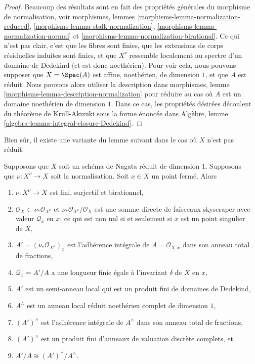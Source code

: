 \begin{proof}
Beaucoup des résultats sont en fait des propriétés
générales du morphisme de normalisation, voir
morphismes, lemmes
\ref{morphisms-lemma-normalization-reduced},
\ref{morphisms-lemma-stalk-normalization},
\ref{morphisms-lemma-normalization-normal} et
\ref{morphisms-lemma-normalization-birational}. Ce qui n'est
pas clair, c'est que les fibres sont finies, que les
extensions de corps résiduelles induites sont finies, et que
$X^\nu$ ressemble localement au spectre d'un domaine de
Dedekind (et est donc noethérien). Pour voir cela, nous pouvons
supposer que $X = \Spec(A)$ est affine, noethérien, de
dimension $1$, et que $A$ est réduit. Nous pouvons alors
utiliser la description dans morphismes, lemme
\ref{morphisms-lemma-description-normalization} pour réduire au cas où
$A$ est un domaine noethérien de dimension $1$. Dans ce cas, les
propriétés désirées découlent du théorème de Krull-Akizuki sous la forme
énoncée dans Algèbre, lemme \ref{algebra-lemma-integral-closure-Dedekind}.
\end{proof}

\noindent
Bien sûr, il existe une variante du lemme
suivant dans le cas où $X$ n'est pas réduit.

\begin{lemma}
\label{lemma-prepare-delta-invariant}
Supposons que $X$ soit un schéma de Nagata réduit de dimension $1$. Supposons que
$\nu : X^\nu \to X$ soit la normalisation. Soit $x \in X$ un point fermé. Alors
\begin{enumerate}
\item $\nu : X^\nu \to X$ est fini, surjectif et
birationnel, \item $\mathcal{O}_X \subset
\nu_*\mathcal{O}_{X^\nu}$ et
$\nu_*\mathcal{O}_{X^\nu}/\mathcal{O}_X$ est une somme
directe de faisceaux skyscraper avec valeur
$\mathcal{Q}_x$ en $x$, ce qui est non nul si et
seulement si $x$ est un point singulier de $X$, \item
$A' = (\nu_*\mathcal{O}_{X^\nu})_x$ est l'adhérence
intégrale de $A = \mathcal{O}_{X, x}$ dans son anneau
total de fractions, \item $\mathcal{Q}_x = A'/A$ a une
longueur finie égale à l'invariant $\delta$ de $X$ en
$x$, \item $A'$ est un semi-anneau local qui est un
produit fini de domaines de Dedekind, \item $A^\wedge$
est un anneau local réduit noethérien complet de
dimension $1$, \item $(A')^\wedge$ est l'adhérence
intégrale de $A^\wedge$ dans son anneau total de fractions,
\item $(A')^\wedge$ est un produit fini d'anneaux de valuation
discrète complets, et \item $A'/A \cong (A')^\wedge/A^\wedge$.
\end{enumerate}
\end{lemma}

